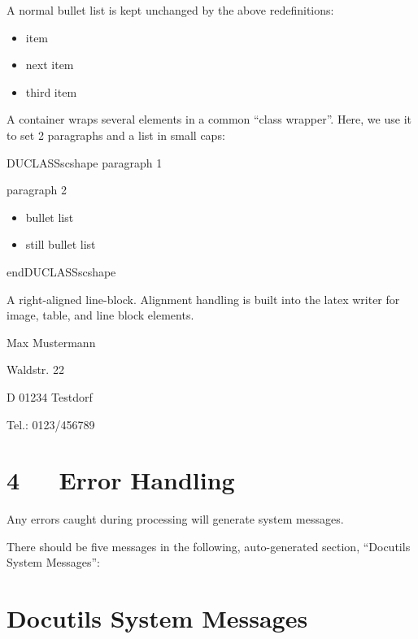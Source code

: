 \documentclass[a4paper]{article}
\newenvironment{DUclass}[1]%
    {%
     \def\DocutilsClassFunctionName{DUCLASS#1}
     \csname \DocutilsClassFunctionName \endcsname}%
    {\csname end\DocutilsClassFunctionName \endcsname}%
\newenvironment{DUlineblock}[1]{%
    \list{}{\setlength{\partopsep}{\parskip}
            \addtolength{\partopsep}{\baselineskip}
            \setlength{\topsep}{0pt}
            \setlength{\itemsep}{0.15\baselineskip}
            \setlength{\parsep}{0pt}
            \setlength{\leftmargin}{#1}}
    \raggedright
  }
  {\endlist}
\begin{document}
A normal bullet list is kept unchanged by the above redefinitions:

\begin{itemize}
\item item

\item next item

\item third item
\end{itemize}

A container wraps several elements in a common “class wrapper”. Here, we use
it to set 2 paragraphs and a list in small caps:

\newcommand*{\DUCLASSscshape}{\scshape}

\begin{DUclass}{scshape}
paragraph 1

paragraph 2

\begin{itemize}
\item bullet list

\item still bullet list
\end{itemize}
\end{DUclass}

A right-aligned line-block. Alignment handling is built into the latex
writer for image, table, and line block elements.

\begin{DUlineblock}{0em}
\raggedleft
\item[] Max Mustermann
\item[] Waldstr. 22
\item[] D 01234 Testdorf
\item[] Tel.: 0123/456789
\end{DUlineblock}



\section{4   Error Handling%
  \label{error-handling}%
}

Any errors caught during processing will generate system messages.

There should be five messages in the following, auto-generated
section, “Docutils System Messages”:



\section[Docutils System Messages]{\color{red}Docutils System Messages%
}
\end{document}
